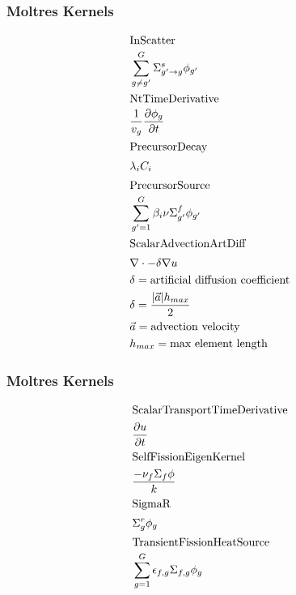 \begin{frame}
        \frametitle{Moltres Kernels}
\footnotesize{
\begin{align*}
\intertext{InScatter}
&\sum_{g \ne g'}^G
        \Sigma_{g'\rightarrow g}^s \phi_{g'}\\
\intertext{NtTimeDerivative}
&\frac{1}{v_g}\frac{\partial \phi_g}{\partial t}\\
\intertext{PrecursorDecay}
&\lambda_i C_i\\
\intertext{PrecursorSource}
&\sum_{g'= 1}^G \beta_i \nu
        \Sigma_{g'}^f \phi_{g'}\\
\intertext{ScalarAdvectionArtDiff}
&\nabla \cdot -\delta \nabla u\\
        &\delta = \mbox{artificial diffusion coefficient}\\
        &\delta = \frac{|\vec{a}| h_{max}}{2}\\
        &\vec{a} = \mbox{advection velocity}\\
        &h_{max} = \mbox{max element length}
\end{align*}
}
\end{frame}

\begin{frame}
        \frametitle{Moltres Kernels}
        \footnotesize{
\begin{align*}
\intertext{ScalarTransportTimeDerivative}
&\frac{\partial u}{\partial t}\\
\intertext{SelfFissionEigenKernel}
&\frac{-\nu_f \Sigma_f \phi}{k}\\
\intertext{SigmaR}
&\Sigma_g^r \phi_g\\
\intertext{TransientFissionHeatSource}
&\sum_{g=1}^G \epsilon_{f,g}\Sigma_{f,g}\phi_g\\
\end{align*}
        }
\end{frame}


